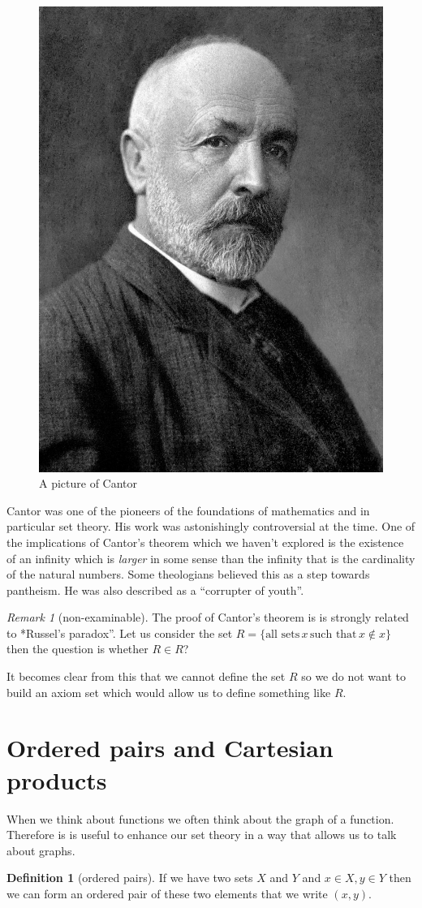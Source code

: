 \documentclass[
]{book}
\theoremstyle{definition}
\newtheorem{definition}{Definition}[chapter]
\theoremstyle{definition}
\theoremstyle{definition}
\theoremstyle{definition}
\theoremstyle{remark}
\newtheorem*{remark}{Remark}
\begin{document}
\begin{figure}
\includegraphics[width=0.3\linewidth]{Cantor} \caption{A picture of Cantor}\label{fig:unnamed-chunk-5}
\end{figure}

Cantor was one of the pioneers of the foundations of mathematics and in particular set theory. His work was astonishingly controversial at the time. One of the implications of Cantor's theorem which we haven't explored is the existence of an infinity which is \emph{larger} in some sense than the infinity that is the cardinality of the natural numbers. Some theologians believed this as a step towards pantheism. He was also described as a ``corrupter of youth''.

\begin{remark}[non-examinable]
The proof of Cantor's theorem is is strongly related to *Russel's paradox''. Let us consider the set \(R= \{ \mbox{all sets}\, x \,\mbox{such that} \, x \notin x \}\) then the question is whether \(R \in R\)?

It becomes clear from this that we cannot define the set \(R\) so we do not want to build an axiom set which would allow us to define something like \(R\).
\end{remark}

\section{Ordered pairs and Cartesian products}\label{ordered-pairs-and-cartesian-products}

When we think about functions we often think about the graph of a function. Therefore is is useful to enhance our set theory in a way that allows us to talk about graphs.

\begin{definition}[ordered pairs]
If we have two sets \(X\) and \(Y\) and \(x \in X, y \in Y\) then we can form an ordered pair of these two elements that we write \((x,y)\).
\end{definition}
\end{document}
